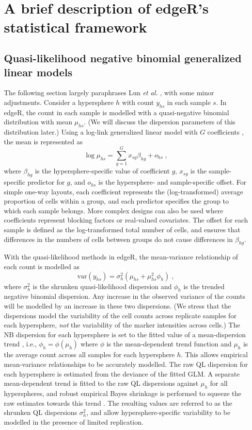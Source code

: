 \documentclass{article}
\begin{document}
\section{A brief description of edgeR's statistical framework}

\subsection{Quasi-likelihood negative binomial generalized linear models}
The following section largely paraphrases Lun \textit{et al.} \cite{lun2016delicious}, with some minor adjustments.
Consider a hypersphere $h$ with count $y_{hs}$ in each sample $s$.
In edgeR, the count in each sample is modelled with a quasi-negative binomial distribution with mean $\mu_{hs}$.
(We will discuss the dispersion parameters of this distribution later.)
Using a log-link generalized linear model with $G$ coefficients \cite{mccarthy2012differential}, the mean is represented as
\[
    \log \mu_{hs} = \sum_{g=1}^G x_{sg} \beta_{hg} + o_{hs} \;,
\]
where $\beta_{hg}$ is the hypersphere-specific value of coefficient $g$, $x_{sg}$ is the sample-specific predictor for $g$, and $o_{hs}$ is the hypersphere- and sample-specific offset.
For simple one-way layouts, each coefficient represents the (log-transformed) average proportion of cells within a group, and each predictor specifies the group to which each sample belongs.
More complex designs can also be used where coefficients represent blocking factors or real-valued covariates.
The offset for each sample is defined as the log-transformed total number of cells, and ensures that differences in the numbers of cells between groups do not cause differences in $\beta_{hg}$.

With the quasi-likelihood methods in edgeR, the mean-variance relationship of each count is modelled as
\[
    \mbox{var}(y_{hs}) = \sigma^2_{h} (\mu_{hs} + \mu_{hs}^2 \phi_h) \;,
\]
where $\sigma^2_h$ is the shrunken quasi-likelihood dispersion and $\phi_h$ is the trended negative binomial dispersion.
Any increase in the observed variance of the counts will be modelled by an increase in these two dispersions.
(We stress that the dispersions model the variability of the cell counts across replicate samples for each hypersphere, \textit{not} the variability of the marker intensities across cells.)
The NB dispersion for each hypersphere is set to the fitted value of a mean-dispersion trend \cite{mccarthy2012differential}, i.e., $\phi_h = \phi(\mu_h)$ where $\phi$ is the mean-dependent trend function and $\mu_h$ is the average count across all samples for each hypersphere $h$.
This allows empirical mean-variance relationships to be accurately modelled.
The raw QL dispersion for each hypersphere is estimated from the deviance of the fitted GLM.
A separate mean-dependent trend is fitted to the raw QL dispersions against $\mu_h$ for all hyperspheres, and robust empirical Bayes shrinkage is performed to squeeze the raw estimates towards this trend \cite{lund2012detecting,phipson2016robust}.
The resulting values are referred to as the shrunken QL dispersions $\sigma^2_h$, and allow hypersphere-specific variability to be modelled in the presence of limited replication.
\end{document}
